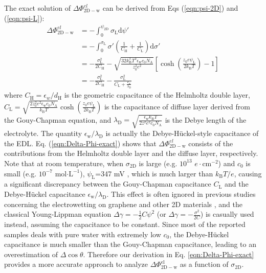 \documentclass[journal=ancac3,manuscript=article,email=true]{achemso}
\begin{document}
The exact solution of \(\Delta
\Phi_{\mathrm{2D-w}}^{el}\) can be derived from Eqs (\ref{eqn:psi-2D})
and (\ref{eqn:psi-L}):
\begin{equation}
\label{eqn:Delta-Phi-exact}
\begin{aligned}
\Delta \Phi_{\mathrm{2D-w}}^{el}
&= -\int_{0}^{\psi_{\mathrm{2D}}} \sigma_{\mathrm{L}} \mathrm{d}\psi' \\
&= -\int_{0}^{\sigma_{\mathrm{L}}} \sigma'\left(
   \frac{1}{C_{\mathrm{H}}} + \frac{1}{C_{\mathrm{L}}}
                                          \right) \mathrm{d}\sigma' \\
&= -\frac{\sigma_{\mathrm{L}}^{2}}{2C_{\mathrm{H}}}
    -\sqrt{\frac{32k_{\mathrm{B}}^{3}T^{3} \epsilon_{\mathrm{w}} c_{0} N_{\mathrm{A}}}{z_{0}^{2}e^{2}}}
   \left[\cosh(\frac{z_{0}e\psi_{\mathrm{L}}}{2k_{\mathrm{B}}T}) - 1\right] \\
&= -\frac{\sigma_{\mathrm{L}}^{2}}{2C_{\mathrm{H}}} 
   - \frac{\sigma_{\mathrm{L}}^{2}}{C_{\mathrm{L}} 
   + \frac{\epsilon_{w}}{\lambda_{\mathrm{D}}}}
\end{aligned}
\end{equation}
where \(C_{\mathrm{H}}=\epsilon_{w}/d_{\mathrm{H}}\) is the geometric
capacitance of the Helmholtz double layer,
\(C_{\mathrm{L}}=\sqrt{\frac{2z_{0}^{2}e^{2}\epsilon_{\mathrm{w}}c_{0}N_{\mathrm{A}}}{k_{\mathrm{B}}T}}
\cosh (\frac{z_{0}e\psi_{\mathrm{L}}}{2k_{\mathrm{B}}T})\) is the
capacitance of diffuse layer derived from the Gouy-Chapman equation,
and
\(\lambda_{\mathrm{D}}=\sqrt{\frac{\epsilon_{\mathrm{w}}k_{\mathrm{B}}T}{2z^{2}e^{2}c_{0}N_{\mathrm{A}}}}\)
is the Debye length of the electrolyte. The quantity
\(\epsilon_{\mathrm{w}}/\lambda_{\mathrm{D}}\) is actually the
Debye-Hückel-style capacitance of the EDL.
Eq. (\ref{eqn:Delta-Phi-exact}) shows that \(\Delta
\Phi_{\mathrm{2D-w}}^{el}\) consists of the contributions from the
Helmholtz double layer and the diffuse layer, respectively.  Note that
at room temperature, when \(\sigma_{\mathrm{2D}}\) is large
(e.g. \(10^{13}\) \(e\cdot \mathrm{cm}^{-2}\)) and \(c_{0}\) is small
(e.g. \(10^{-7}\) mol\(\cdot \mathrm{L}^{-1}\)),
\(\psi_{\mathrm{L}}\)=347 mV
, which is much larger than \(k_{\mathrm{B}}T/e\), causing a significant
discrepancy between the Gouy-Chapman capacitance \(C_{\mathrm{L}}\) and
the Debye-Hückel capacitance
\(\epsilon_{\mathrm{w}}/\lambda_{\mathrm{D}}\). This effect is often
ignored in previous studies concerning the electrowetting on graphene
and other 2D materials
\cite{ostrowski_tunable_2014,daub_electrowetting_2007,goniszewski_correlation_2016,ashraf_doping-induced_2016},
and the classical Young-Lippman equation \(\Delta
\gamma=-\frac{1}{2}C\psi^{2}\) (or \(\Delta
\gamma=-\frac{\sigma^{2}}{2C}\)) is casually used instead, assuming the
capacitance to be constant. Since most of the reported samples deals with pure water with extremely low \(c_{0}\), the Debye-Hückel capacitance is much smaller than the Gouy-Chapman capacitance, leading to an overestimation of \(\Delta\cos\theta\). Therefore our
derivation in Eq. \ref{eqn:Delta-Phi-exact} provides a more accurate
approach to analyze \(\Delta \Phi_{\mathrm{2D-w}}^{\mathrm{el}}\) as a function of \(\sigma_{\mathrm{2D}}\).
\end{document}
